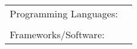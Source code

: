 \documentclass[]{awesome-cv}
\begin{document}
\vspace{-5mm}


\begin{cventries}
	\cventry
	{}
	{\def\arraystretch{1.15}{\begin{tabular}{ l l }
		Programming Languages:  & {\skill{ Javascript, C++, Java, Swift, C, C\#, ARM}} \\
		 \\
		Frameworks/Software:  & {\skill{ Node.js, React, Npm/Yarn, Git/GitHub, Xcode, Unity}} \\
		\end{tabular}}}
	{}
	{}
	{}
\end{cventries}
\end{document}
